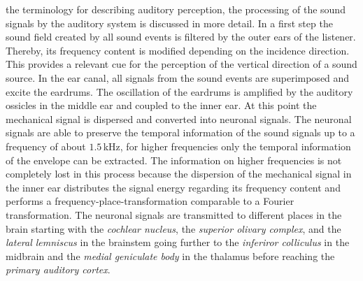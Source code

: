  the terminology for describing auditory
perception, the processing of the sound signals by the auditory system is
discussed in more detail.
In a first step the sound field created by all sound events is filtered by
the outer ears of the listener. Thereby, its frequency content is modified depending on the
incidence direction. This provides a relevant cue
for the perception of the vertical direction of a sound
source.\autocite[See p.\,97ff in][]{Blauert1997}
In the ear canal, all signals from the sound events are superimposed and excite
the eardrums.
The oscillation of the eardrums is amplified by the auditory ossicles in the
middle ear and coupled to the inner ear. At this point the mechanical signal is
dispersed and converted into neuronal signals.
The neuronal signals are able to preserve the temporal information of the sound
signals up to a frequency of about $1.5$\,kHz, for higher frequencies only the
temporal information of the envelope can be extracted. The information on
higher frequencies is not completely lost in this process because the
dispersion of the mechanical signal in the inner ear distributes the signal energy
regarding its frequency content and performs a frequency-place-transformation
comparable to a Fourier transformation.
The neuronal
signals are transmitted to different places in the brain starting with the
\emph{cochlear nucleus}, the \emph{superior olivary complex}, and the \emph{lateral
lemniscus} in the brainstem
going further to the \emph{inferiror colliculus} in the midbrain and the
\emph{medial geniculate body} in the thalamus before reaching the \emph{primary
auditory cortex}.

